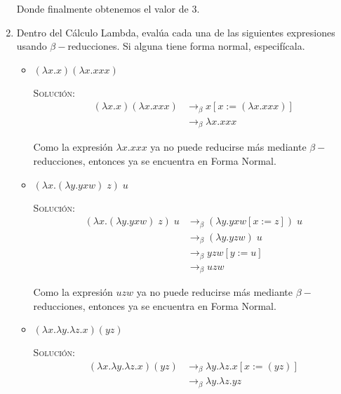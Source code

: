 \documentclass[letterpaper,11pt]{article}
\begin{document}
\begin{enumerate}
    Donde finalmente obtenemos el valor de $3$.

    \item Dentro del Cálculo Lambda, evalúa cada una de las siguientes 
    expresiones usando $\beta -$reducciones. Si alguna tiene forma normal, 
    especifícala.
    \begin{itemize}
        \item $(\lambda x.x)(\lambda x.xxx)$
        
        \textsc{Solución:}
        \begin{align*}
            (\lambda x.x)(\lambda x.xxx) 
            &\rightarrow_{\beta} x [x := (\lambda x.xxx)] \\ 
            &\rightarrow_{\beta} \lambda x.xxx
        \end{align*}

        Como la expresión $\lambda x.xxx$ ya no puede reducirse más mediante 
        $\beta -$reducciones, entonces ya se encuentra en Forma Normal.

        \item $(\lambda x.(\lambda y.yxw) \; z) \; u$
        
        \textsc{Solución:}
        \begin{align*}
            (\lambda x.(\lambda y.yxw) \; z) \; u
            &\rightarrow_{\beta} (\lambda y.yxw[x := z]) \; u \\ 
            &\rightarrow_{\beta} (\lambda y.yzw) \; u \\ 
            &\rightarrow_{\beta} yzw[y := u] \\
            &\rightarrow_{\beta} uzw 
        \end{align*}

        Como la expresión $uzw$ ya no puede reducirse más mediante 
        $\beta -$reducciones, entonces ya se encuentra en Forma Normal.

        \item $(\lambda x.\lambda y.\lambda z.x) (yz)$
        
        \textsc{Solución:}
        \begin{align*}
            (\lambda x.\lambda y.\lambda z.x) (yz)
            &\rightarrow_{\beta} 
            \lambda y.\lambda z.x[x := (yz)] \\
            &\rightarrow_{\beta}
            \lambda y.\lambda z.yz
        \end{align*}


\end{itemize}
\end{enumerate}
\end{document}

